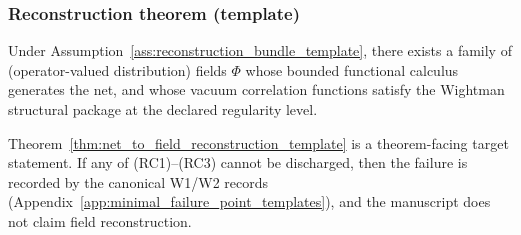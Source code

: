 \subsubsection{Reconstruction theorem (template)}
\begin{theorem}
\label{thm:net_to_field_reconstruction_template}
\MathTag Under Assumption~\ref{ass:reconstruction_bundle_template}, there exists a family of (operator-valued distribution) fields $\Phi$ whose bounded functional calculus generates the net, and whose vacuum correlation functions satisfy the Wightman structural package at the declared regularity level.
\end{theorem}

\AuditTag Theorem~\ref{thm:net_to_field_reconstruction_template} is a theorem-facing target statement.
If any of (RC1)--(RC3) cannot be discharged, then the failure is recorded by the canonical W1/W2 records (Appendix~\ref{app:minimal_failure_point_templates}), and the manuscript does not claim field reconstruction.

